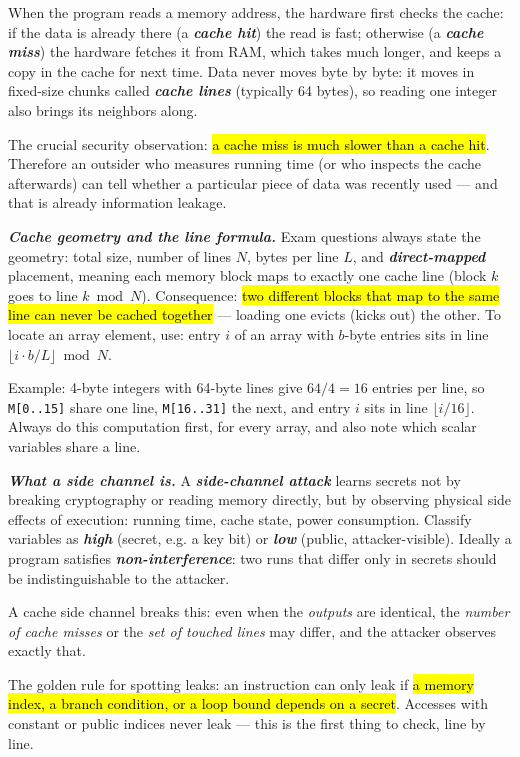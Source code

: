 \documentclass[12pt, a4paper]{article}
\newcommand{\term}[1]{\textbf{\textit{#1}}}        %
\newcommand{\imp}[1]{\hl{#1}}                       %
\begin{document}
When the program reads a memory address, the hardware first checks the cache: if the data is already there (a \term{cache hit}) the read is fast; otherwise (a \term{cache miss}) the hardware fetches it from RAM, which takes much longer, and keeps a copy in the cache for next time.
Data never moves byte by byte: it moves in fixed-size chunks called \term{cache lines} (typically 64 bytes), so reading one integer also brings its neighbors along.

The crucial security observation: \imp{a cache miss is much slower than a cache hit}. Therefore an outsider who measures running time (or who inspects the cache afterwards) can tell whether a particular piece of data was recently used --- and that is already information leakage.

\term{Cache geometry and the line formula.} Exam questions always state the geometry: total size, number of lines $N$, bytes per line $L$, and \term{direct-mapped} placement, meaning each memory block maps to exactly one cache line (block $k$ goes to line $k \bmod N$).
Consequence: \imp{two different blocks that map to the same line can never be cached together} --- loading one evicts (kicks out) the other.
To locate an array element, use: entry $i$ of an array with $b$-byte entries sits in line $\lfloor i \cdot b / L \rfloor \bmod N$.

Example: 4-byte integers with 64-byte lines give $64/4 = 16$ entries per line, so \texttt{M[0..15]} share one line, \texttt{M[16..31]} the next, and entry $i$ sits in line $\lfloor i/16 \rfloor$. Always do this computation first, for every array, and also note which scalar variables share a line.

\term{What a side channel is.} A \term{side-channel attack} learns secrets not by breaking cryptography or reading memory directly, but by observing physical side effects of execution: running time, cache state, power consumption.
Classify variables as \term{high} (secret, e.g. a key bit) or \term{low} (public, attacker-visible). Ideally a program satisfies \term{non-interference}: two runs that differ only in secrets should be indistinguishable to the attacker.

A cache side channel breaks this: even when the \emph{outputs} are identical, the \emph{number of cache misses} or the \emph{set of touched lines} may differ, and the attacker observes exactly that.

The golden rule for spotting leaks: an instruction can only leak if \imp{a memory index, a branch condition, or a loop bound depends on a secret}. Accesses with constant or public indices never leak --- this is the first thing to check, line by line.
\end{document}
